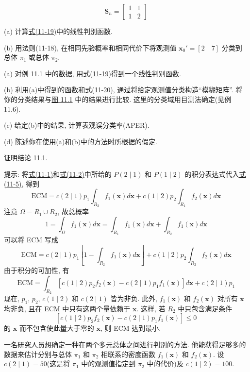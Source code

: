 
\[
\mathbf{S}_n=\begin{bmatrix}1&1\\1&2\end{bmatrix}
\]

(a) 计算\hyperref[eq:11-19]{式(11-19)}中的线性判别函数.

(b) 用法则(11-18), 在相同先验概率和相同代价下将观测值 $\mathbf{x}_0'=[2\quad 7]$ 分类到总体 $\pi_1$ 或总体 $\pi_2$.

\quad (a) 对例 11.1 中的数据, 用\hyperref[eq:11-19]{式(11-19)}得到一个线性判别函数.

(b) 利用(a)中得到的函数和\hyperref[eq:11-20]{式(11-20)}, 通过将给定观测值分类构造“模糊矩阵”. 将你的分类结果与\hyperref[fig:11.1]{图 11.1} 中的结果进行比较. 这里的分类域用目测法确定(见例 11.6).

(c) 给定(b)中的结果, 计算表观误分类率(APER).

(d) 陈述你在使用(a)和(b)中的方法时所根据的假定.

\quad 证明结论 11.1.

提示: 将\hyperref[eq:11-1]{式(11-1)}和\hyperref[eq:11-2]{式(11-2)}中所给的 $P(2\mid 1)$ 和 $P(1\mid 2)$ 的积分表达式代入\hyperref[eq:11-5]{式(11-5)}, 得到
\[
\mathrm{ECM}=c(2\mid 1)p_1\int_{R_2}f_1(\mathbf{x})d\mathbf{x}+c(1\mid 2)p_2\int_{R_1}f_2(\mathbf{x})d\mathbf{x}
\]
注意 $\Omega=R_1\cup R_2$, 故总概率
\[
1=\int_{\Omega}f_1(\mathbf{x})d\mathbf{x}=\int_{R_1}f_1(\mathbf{x})d\mathbf{x}+\int_{R_2}f_1(\mathbf{x})d\mathbf{x}
\]
可以将 ECM 写成
\[
\mathrm{ECM}=c(2\mid 1)p_1\left[1-\int_{R_2}f_1(\mathbf{x})d\mathbf{x}\right]+c(1\mid 2)p_2\int_{R_2}f_2(\mathbf{x})d\mathbf{x}
\]
由于积分的可加性, 有
\[
\mathrm{ECM}=\int_{R_2}\left[c(1\mid 2)p_2f_2(\mathbf{x})-c(2\mid 1)p_1f_1(\mathbf{x})\right]d\mathbf{x}+c(2\mid 1)p_1
\]
现在, $p_1$, $p_2$, $c(1\mid 2)$ 和 $c(2\mid 1)$ 皆为非负. 此外, $f_1(\mathbf{x})$ 和 $f_2(\mathbf{x})$ 对所有 $\mathbf{x}$ 均非负, 且在 ECM 中只有这两个量依赖于 $\mathbf{x}$. 这样, 若 $R_2$ 中只包含满足条件
\[
\left[c(1\mid 2)p_2f_2(\mathbf{x})-c(2\mid 1)p_1f_1(\mathbf{x})\right]\le 0
\]
的 $\mathbf{x}$ 而不包含使此量大于零的 $\mathbf{x}$, 则 ECM 达到最小.

\quad 一名研究人员想确定一种在两个多元总体之间进行判别的方法. 他能获得足够多的数据来估计分别与总体 $\pi_1$ 和 $\pi_2$ 相联系的密度函数 $f_1(\mathbf{x})$ 和 $f_2(\mathbf{x})$. 设 $c(2\mid 1)=50$(这是将 $\pi_1$ 中的观测值指定到 $\pi_2$ 中的代价)及 $c(1\mid 2)=100$.

